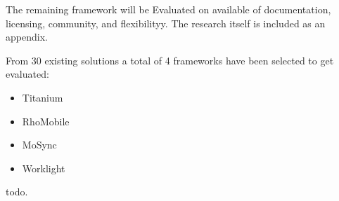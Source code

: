 The remaining framework will be Evaluated on available of documentation, licensing, community, and flexibilityy. The research itself is included as an appendix.


From 30 existing solutions a total of 4 frameworks have been selected to get evaluated:
\begin{itemize}
\item Titanium
\item RhoMobile
\item MoSync
\item Worklight
\end{itemize}


todo.
